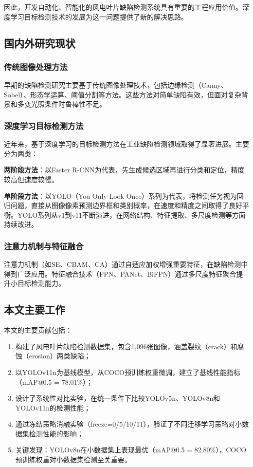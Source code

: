\documentclass[12pt,a4paper]{article}
\begin{document}
因此，开发自动化、智能化的风电叶片缺陷检测系统具有重要的工程应用价值。深度学习目标检测技术的发展为这一问题提供了新的解决思路。

\subsection{国内外研究现状}

\subsubsection{传统图像处理方法}
早期的缺陷检测研究主要基于传统图像处理技术，包括边缘检测（Canny、Sobel）、形态学运算、阈值分割等方法。这些方法对简单缺陷有效，但面对复杂背景和多变光照条件时鲁棒性不足。

\subsubsection{深度学习目标检测方法}
近年来，基于深度学习的目标检测方法在工业缺陷检测领域取得了显著进展。主要分为两类：

\textbf{两阶段方法}：以Faster R-CNN为代表，先生成候选区域再进行分类和定位，精度较高但速度较慢。

\textbf{单阶段方法}：以YOLO（You Only Look Once）系列为代表，将检测任务视为回归问题，直接从图像像素预测边界框和类别概率，在速度和精度之间取得了良好平衡。YOLO系列从v1到v11不断演进，在网络结构、特征提取、多尺度检测等方面持续改进。

\subsubsection{注意力机制与特征融合}
注意力机制（如SE、CBAM、CA）通过自适应加权增强重要特征，在缺陷检测中得到广泛应用。特征融合技术（FPN、PANet、BiFPN）通过多尺度特征聚合提升小目标检测能力。

\subsection{本文主要工作}

本文的主要贡献包括：
\begin{enumerate}[noitemsep]
  \item 构建了风电叶片缺陷检测数据集，包含1,096张图像，涵盖裂纹（crack）和腐蚀（erosion）两类缺陷；
  \item 以YOLOv11n为基线模型，从COCO预训练权重微调，建立了基线性能指标（mAP@0.5 = 78.01\%）；
  \item 设计了系统性对比实验，在统一条件下比较YOLOv5n、YOLOv8n和YOLOv11n的检测性能；
  \item 通过冻结策略消融实验（freeze=0/5/10/11），验证了不同迁移学习策略对小数据集检测性能的影响；
  \item 关键发现：YOLOv8n在小数据集上表现最优（mAP@0.5 = 82.80\%），COCO预训练权重对小数据集检测至关重要。
\end{enumerate}
\end{document}
